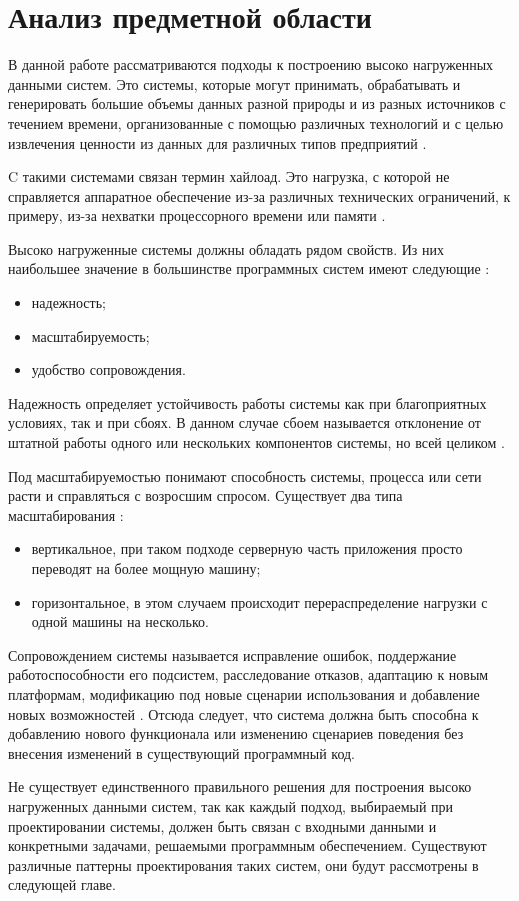 \chapter{Анализ предметной области}

В данной работе рассматриваются подходы к построению высоко нагруженных данными систем. Это системы, которые могут принимать,
обрабатывать и генерировать большие объемы данных
разной природы и из разных источников с течением
времени, организованные с помощью различных
технологий и с целью извлечения ценности из данных
для различных типов предприятий \cite{cyberlenin1}.

C такими системами связан термин хайлоад. Это нагрузка, с которой не справляется аппаратное обеспечение из-за различных технических ограничений, к примеру, из-за нехватки процессорного времени или памяти \cite{bunin1}.

Высоко нагруженные системы должны обладать рядом свойств. Из них наибольшее значение в большинстве программных систем имеют следующие \cite{kleppman}:
\begin{itemize}
	\item надежность;
	\item масштабируемость;
	\item удобство сопровождения.
\end{itemize}

Надежность определяет устойчивость работы системы как при благоприятных условиях, так и при сбоях. В данном случае сбоем называется отклонение от штатной работы одного или нескольких компонентов системы, но всей целиком \cite{kleppman}.

Под масштабируемостью понимают способность системы, процесса или сети расти и справляться с возросшим спросом. Существует два типа масштабирования \cite{cyberlenin1}:
\begin{itemize}
	\item вертикальное, при таком подходе серверную часть приложения просто переводят на более мощную машину;
	\item горизонтальное, в этом случаем происходит перераспределение нагрузки с одной машины на несколько. 
\end{itemize}

Сопровождением системы называется исправление ошибок,
поддержание работоспособности его подсистем,
расследование отказов, адаптацию к новым платформам,
модификацию под новые сценарии использования и
добавление новых возможностей \cite{cyberlenin1}. Отсюда следует, что система должна быть способна к добавлению нового функционала или изменению сценариев поведения без внесения изменений в существующий программный код.

Не существует единственного правильного решения для построения высоко нагруженных данными систем, так как каждый подход, выбираемый при проектировании системы, должен быть связан с входными данными и конкретными задачами, решаемыми программным обеспечением. Существуют различные паттерны проектирования таких систем, они будут рассмотрены в следующей главе.